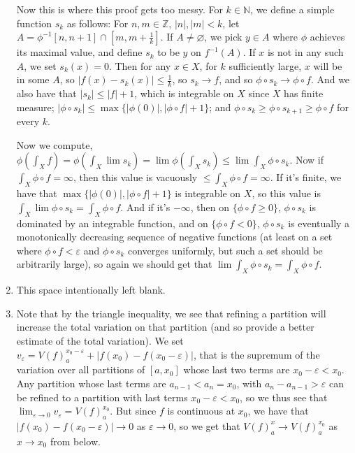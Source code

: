 \documentclass{article}
\newcommand\ZZ{\mathbb Z}
\newcommand\NN{\mathbb N}
\begin{document}
\begin{enumerate}
     Now this is where this proof gets too messy. For $k \in \NN$, we define a
     simple function $s_k$ as follows: For $n,m \in \ZZ$, $|n|,|m| < k$, let $A
     = \phi^{-1}[n,n+1] \cap [m,m+\frac1k]$. If $A \neq \varnothing$, we pick $y
     \in A$ where $\phi$ achieves its maximal value, and define $s_k$ to be $y$
     on $f^{-1}(A)$. If $x$ is not in any such $A$, we set $s_k(x)=0$.  Then for
     any $x \in X$, for $k$ sufficiently large, $x$ will be in some $A$, so
     $|f(x) - s_k(x)| \leq \frac1k$, so $s_k \to f$, and so $\phi \circ s_k \to
     \phi \circ f$. And we also have that $|s_k| \leq |f|+1$, which is
     integrable on $X$ since $X$ has finite measure; $|\phi \circ s_k| \leq
     \max\{|\phi(0)|,|\phi \circ f| + 1\}$; and $\phi \circ s_k \geq \phi \circ
     s_{k+1} \geq \phi \circ f$ for every $k$.

     Now we compute, $\phi(\int_X f) = \phi(\int_X \lim s_k) = \lim \phi(\int_X
     s_k) \leq \lim \int_X \phi \circ s_k$. Now if $\int_X \phi \circ f =
     \infty$, then this value is vacuously $\leq \int_X \phi \circ f = \infty$.
     If it's finite, we have that $\max\{|\phi(0)|,|\phi \circ f| + 1\}$ is
     integrable on $X$, so this value is $\int_X \lim \phi \circ s_k = \int_X
     \phi \circ f$. And if it's $-\infty$, then on $\{\phi \circ f \geq 0\}$,
     $\phi \circ s_k$ is dominated by an integrable function, and on $\{\phi
     \circ f < 0\}$, $\phi \circ s_k$ is eventually a monotonically decreasing
     sequence of negative functions (at least on a set where $\phi \circ f <
     \varepsilon$ and $\phi \circ s_k$ converges uniformly, but such a set
     should be arbitrarily large), so again we should get that $\lim \int_X \phi
     \circ s_k = \int_X \phi \circ f$.

  \item This space intentionally left blank.

  \item Note that by the triangle inequality, we see that refining a partition
     will increase the total variation on that partition (and so provide a
     better estimate of the total variation). We set $v_\varepsilon =
     V(f)_a^{x_0-\varepsilon} + |f(x_0) - f(x_0-\varepsilon)|$, that is the
     supremum of the variation over all partitions of $[a,x_0]$ whose last two
     terms are $x_0-\varepsilon < x_0$. Any partition whose last terms are
     $a_{n-1} < a_n = x_0$, with $a_n - a_{n-1} > \varepsilon$ can be refined to
     a partition with last terms $x_0-\varepsilon < x_0$, so we thus see that
     $\lim_{\varepsilon\to0}v_\varepsilon = V(f)_a^{x_0}$. But since $f$ is
     continuous at $x_0$, we have that $|f(x_0) - f(x_0-\varepsilon)| \to 0$ as
     $\varepsilon \to 0$, so we get that $V(f)_a^{x} \to V(f)_a^{x_0}$ as $x \to
     x_0$ from below.
     

\end{enumerate}
\end{document}
